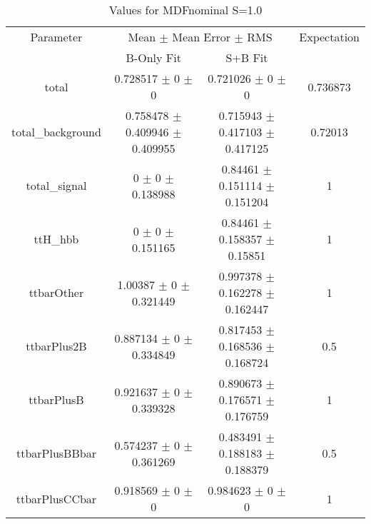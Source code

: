 \begin{table}
\centering
\caption{Values for MDFnominal S=1.0}
\begin{tabular}{cccc}
\toprule
Parameter & \multicolumn{2}{c}{Mean $\pm$ Mean Error $\pm$ RMS} & Expectation\\
 & B-Only Fit & S+B Fit & \\
\midrule
total & \num{0.728517} $\pm$ \num{0} $\pm$ \num{0} & \num{0.721026} $\pm$ \num{0} $\pm$ \num{0} & \num{0.736873}\\
total\_background & \num{0.758478} $\pm$ \num{0.409946} $\pm$ \num{0.409955} & \num{0.715943} $\pm$ \num{0.417103} $\pm$ \num{0.417125} & \num{0.72013}\\
total\_signal & \num{0} $\pm$ \num{0} $\pm$ \num{0.138988} & \num{0.84461} $\pm$ \num{0.151114} $\pm$ \num{0.151204} & \num{1}\\
ttH\_hbb & \num{0} $\pm$ \num{0} $\pm$ \num{0.151165} & \num{0.84461} $\pm$ \num{0.158357} $\pm$ \num{0.15851} & \num{1}\\
ttbarOther & \num{1.00387} $\pm$ \num{0} $\pm$ \num{0.321449} & \num{0.997378} $\pm$ \num{0.162278} $\pm$ \num{0.162447} & \num{1}\\
ttbarPlus2B & \num{0.887134} $\pm$ \num{0} $\pm$ \num{0.334849} & \num{0.817453} $\pm$ \num{0.168536} $\pm$ \num{0.168724} & \num{0.5}\\
ttbarPlusB & \num{0.921637} $\pm$ \num{0} $\pm$ \num{0.339328} & \num{0.890673} $\pm$ \num{0.176571} $\pm$ \num{0.176759} & \num{1}\\
ttbarPlusBBbar & \num{0.574237} $\pm$ \num{0} $\pm$ \num{0.361269} & \num{0.483491} $\pm$ \num{0.188183} $\pm$ \num{0.188379} & \num{0.5}\\
ttbarPlusCCbar & \num{0.918569} $\pm$ \num{0} $\pm$ \num{0} & \num{0.984623} $\pm$ \num{0} $\pm$ \num{0} & \num{1}\\
\bottomrule
\end{tabular}
\end{table}